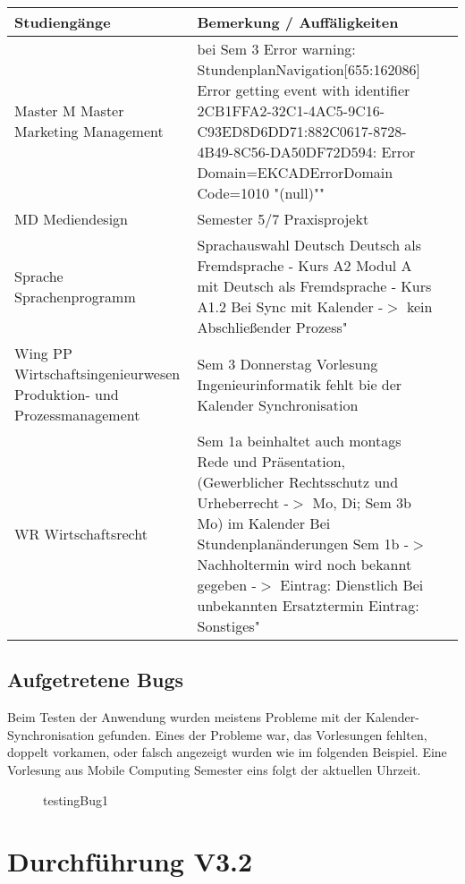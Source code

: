 \noindent%
\begin{tabularx}{\textwidth}{|p{}|X|X| }
\hline
\textbf{Studiengänge} &\textbf{Bemerkung / Auffäligkeiten}   \\ \hline 

Master M  Master Marketing Management &
bei Sem 3 Error warning:
StundenplanNavigation[655:162086] Error getting event with identifier 2CB1FFA2-32C1-4AC5-9C16-C93ED8D6DD71:882C0617-8728-4B49-8C56-DA50DF72D594: Error Domain=EKCADErrorDomain Code=1010 "(null)""   \\ \hline
MD  Mediendesign & Semester 5/7 Praxisprojekt  \\ \hline

Sprache  Sprachenprogramm & 
Sprachauswahl Deutsch
Deutsch als Fremdsprache - Kurs A2 Modul A mit Deutsch als Fremdsprache - Kurs A1.2 Bei Sync mit Kalender -$>$ kein Abschließender Prozess"   \\ \hline
Wing PP Wirtschaftsingenieurwesen Produktion- und Prozessmanagement & 
Sem 3  Donnerstag Vorlesung Ingenieurinformatik fehlt bie der Kalender Synchronisation  \\ \hline
WR  Wirtschaftsrecht & 
Sem 1a beinhaltet auch montags Rede und Präsentation, (Gewerblicher Rechtsschutz und Urheberrecht -$>$ Mo, Di; Sem 3b Mo) im Kalender
Bei Stundenplanänderungen Sem 1b -$>$ Nachholtermin wird noch bekannt gegeben -$>$ Eintrag: Dienstlich
Bei unbekannten Ersatztermin Eintrag: Sonstiges"   \\ \hline
\end{tabularx}

\subsection{Aufgetretene Bugs}

Beim Testen der Anwendung wurden meistens Probleme mit der Kalender-Synchronisation gefunden. Eines der Probleme war, das Vorlesungen fehlten, doppelt vorkamen, oder falsch angezeigt wurden wie im folgenden Beispiel. Eine Vorlesung aus Mobile Computing Semester eins folgt der aktuellen Uhrzeit. \newline

\begin{figure}[H]
	\centering
	\caption{testingBug1}
	\label{fig1}
\end{figure}



\newpage
\section{Durchführung V3.2}
